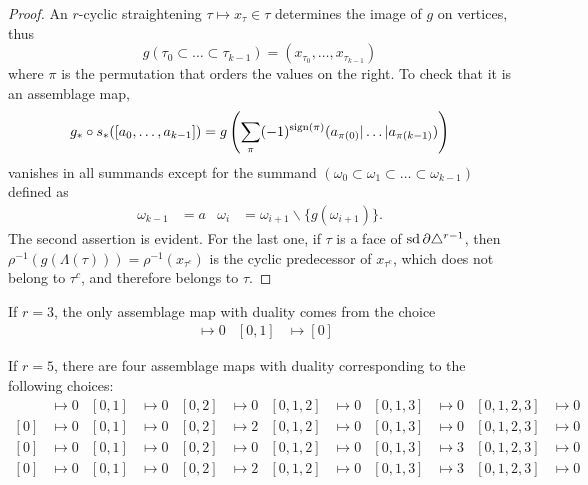 \begin{proof}
	An $r$-cyclic straightening $\tau\mapsto x_{\tau}\in \tau$ determines the image of $g$ on vertices, thus
	\[
	g(\tau_0\subset\dots\subset\tau_{k-1}) = (x_{\tau_0},\dots,x_{\tau_{k-1}})
	\]
	where $\pi$ is the permutation that orders the values on the right. To check that it is an assemblage map,
	\[
	g_*\circ s_*([a_0,\dots,a_{k-1}]) = g\left(\sum_{\pi} (-1)^{\operatorname{sign}(\pi)} (a_{\pi(0)}|\dots|a_{\pi(k-1)})\right)
	\]
	vanishes in all summands except for the summand $(\omega_0 \subset \omega_1 \subset \dots \subset \omega_{k-1})$ defined as
	\begin{align*}
		\omega_{k-1} &= a
		&
		\omega_{i} &= \omega_{i+1}\smallsetminus \{g(\omega_{i+1})\}.
	\end{align*}
	The second assertion is evident. For the last one, if $\tau$ is a face of $\operatorname{sd} \partial \triangle^{r-1}$, then $\rho^{-1}(g(\Lambda(\tau))) = \rho^{-1}(x_{\tau^c})$ is the cyclic predecessor of $x_{\tau^c}$, which does not belong to $\tau^c$, and therefore belongs to $\tau$.
\end{proof}

\begin{example}
	If $r=3$, the only assemblage map with duality comes from the choice
	\begin{align*}
		[0]&\mapsto 0 & [0,1]&\mapsto [0]
	\end{align*}
\end{example}

\begin{example}\label{example:asymmetries5}
	If $r=5$, there are four assemblage maps with duality corresponding to the following choices:
	\begin{align*}
		[0]&\mapsto 0 & [0,1]&\mapsto 0 & [0,2]&\mapsto 0 & [0,1,2]&\mapsto 0 & [0,1,3] & \mapsto 0 & [0,1,2,3] & \mapsto 0 \\
		[0]&\mapsto 0 & [0,1]&\mapsto 0 & [0,2]&\mapsto 2 & [0,1,2]&\mapsto 0 & [0,1,3] & \mapsto 0 & [0,1,2,3] & \mapsto 0 \\
		[0]&\mapsto 0 & [0,1]&\mapsto 0 & [0,2]&\mapsto 0 & [0,1,2]&\mapsto 0 & [0,1,3] & \mapsto 3 & [0,1,2,3] & \mapsto 0 \\
		[0]&\mapsto 0 & [0,1]&\mapsto 0 & [0,2]&\mapsto 2 & [0,1,2]&\mapsto 0 & [0,1,3] & \mapsto 3 & [0,1,2,3] & \mapsto 0
	\end{align*}
\end{example}

